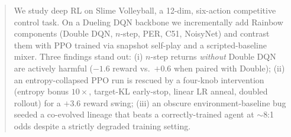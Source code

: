 \begin{abstract}
We study deep RL on Slime Volleyball, a 12-dim, six-action competitive
control task. On a Dueling DQN backbone we incrementally add Rainbow
components (Double DQN, $n$-step, PER, C51, NoisyNet) and contrast them
with PPO trained via snapshot self-play and a scripted-baseline mixer.
Three findings stand out: (i) $n$-step returns \emph{without} Double DQN
are actively harmful ($-1.6$ reward vs.\ $+0.6$ when paired with Double);
(ii) an entropy-collapsed PPO run is rescued by a four-knob intervention
(entropy bonus $10\times$, target-KL early-stop, linear LR anneal,
doubled rollout) for a $+3.6$ reward swing; (iii) an obscure
environment-baseline bug seeded a co-evolved lineage that beats a
correctly-trained agent at $\sim$8:1 odds despite a strictly degraded
training setting.
\end{abstract}
